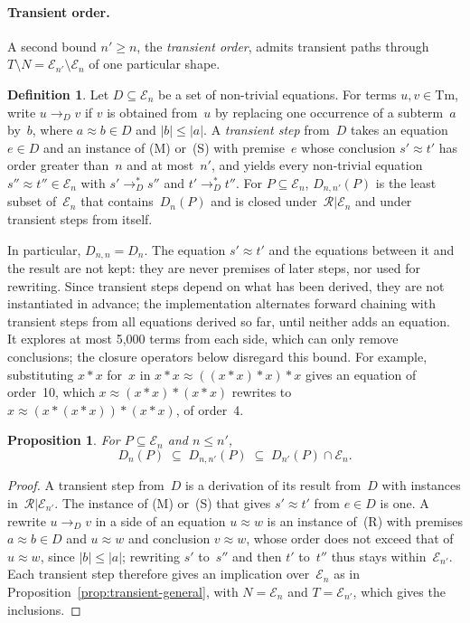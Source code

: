 \documentclass[11pt,a4paper]{article}
\newtheorem{proposition}{Proposition}
\theoremstyle{definition}
\newtheorem{definition}{Definition}
\theoremstyle{remark}
\begin{document}
\paragraph{Transient order.}
A second bound $n' \ge n$, the \emph{transient order}, admits transient paths through $T \setminus N = \mathcal{E}_{n'} \setminus \mathcal{E}_n$ of one particular shape.

\begin{definition}
Let $D \subseteq \mathcal{E}_n$ be a set of non-trivial equations. For terms $u, v \in \mathrm{Tm}$, write $u \to_D v$ if $v$ is obtained from~$u$ by replacing one occurrence of a subterm~$a$ by~$b$, where $a \approx b \in D$ and $|b| \le |a|$. A \emph{transient step} from~$D$ takes an equation $e \in D$ and an instance of (M) or~(S) with premise~$e$ whose conclusion $s' \approx t'$ has order greater than~$n$ and at most~$n'$, and yields every non-trivial equation $s'' \approx t'' \in \mathcal{E}_n$ with $s' \to_D^* s''$ and $t' \to_D^* t''$. For $P \subseteq \mathcal{E}_n$, $D_{n,n'}(P)$ is the least subset of~$\mathcal{E}_n$ that contains~$D_n(P)$ and is closed under~$\mathcal{R}|\mathcal{E}_n$ and under transient steps from itself.
\end{definition}

In particular, $D_{n,n} = D_n$. The equation $s' \approx t'$ and the equations between it and the result are not kept: they are never premises of later steps, nor used for rewriting. Since transient steps depend on what has been derived, they are not instantiated in advance; the implementation alternates forward chaining with transient steps from all equations derived so far, until neither adds an equation. It explores at most 5,000 terms from each side, which can only remove conclusions; the closure operators below disregard this bound. For example, substituting $x * x$ for~$x$ in $x * x \approx ((x * x) * x) * x$ gives an equation of order~10, which $x \approx (x * x) * (x * x)$ rewrites to $x \approx (x * (x * x)) * (x * x)$, of order~4.

\begin{proposition}\label{prop:transient}
For $P \subseteq \mathcal{E}_n$ and $n \le n'$,
\[
  D_n(P) \;\subseteq\; D_{n,n'}(P) \;\subseteq\; D_{n'}(P) \cap \mathcal{E}_n.
\]
\end{proposition}

\begin{proof}
A transient step from~$D$ is a derivation of its result from~$D$ with instances in~$\mathcal{R}|\mathcal{E}_{n'}$. The instance of (M) or~(S) that gives $s' \approx t'$ from $e \in D$ is one. A rewrite $u \to_D v$ in a side of an equation $u \approx w$ is an instance of~(R) with premises $a \approx b \in D$ and $u \approx w$ and conclusion $v \approx w$, whose order does not exceed that of $u \approx w$, since $|b| \le |a|$; rewriting $s'$ to~$s''$ and then $t'$ to~$t''$ thus stays within~$\mathcal{E}_{n'}$. Each transient step therefore gives an implication over~$\mathcal{E}_n$ as in Proposition~\ref{prop:transient-general}, with $N = \mathcal{E}_n$ and $T = \mathcal{E}_{n'}$, which gives the inclusions.
\end{proof}
\end{document}
